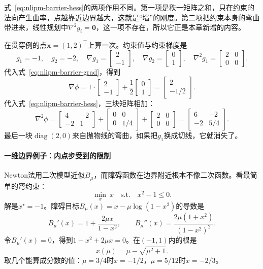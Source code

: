 式~\eqref{eq:nlipm-barrier-hess}的两项作用不同。第一项是秩一矩阵之和，只在约束的法向产生曲率，点越靠近边界越大，这就是“墙”的刚度。第二项把约束本身的弯曲带进来，线性规划中$\nabla^2g_i=\bm{0}$，这一项不存在，所以它正是本章新增的内容。

在贯穿例的点$\bm{x}=(1,2)^\top$上算一次。约束值与约束梯度是
\[
 g_1=-1,\quad g_2=-2,\quad\nabla g_1=\begin{bmatrix}2\\-1\end{bmatrix},\quad\nabla g_2=\begin{bmatrix}0\\1\end{bmatrix},\quad\nabla^2g_1=\begin{bmatrix}2&0\\0&0\end{bmatrix}.
\]
代入式~\eqref{eq:nlipm-barrier-grad}，得到
\[
 \nabla\phi=1\cdot\begin{bmatrix}2\\-1\end{bmatrix}+\frac12\begin{bmatrix}0\\1\end{bmatrix}=\begin{bmatrix}2\\-1/2\end{bmatrix}.
\]
代入式~\eqref{eq:nlipm-barrier-hess}，三块矩阵相加：
\[
 \nabla^2\phi=\begin{bmatrix}4&-2\\-2&1\end{bmatrix}+\begin{bmatrix}0&0\\0&1/4\end{bmatrix}+\begin{bmatrix}2&0\\0&0\end{bmatrix}=\begin{bmatrix}6&-2\\-2&5/4\end{bmatrix}.
\]
最后一块$\operatorname{diag}(2,0)$来自抛物线的弯曲，如果把$g_1$换成切线，它就消失了。

\paragraph{一维边界例子：内点步受到的限制}
Newton法用二次模型近似$B_\mu$，而障碍函数在边界附近根本不像二次函数。看最简单的弯约束：
\[
 \min_x\ x\quad\text{s.t.}\quad x^2-1\leq0.
\]
解是$x^\star=-1$。障碍目标$B_\mu(x)=x-\mu\log(1-x^2)$的导数是
\[
 B_\mu'(x)=1+\frac{2\mu x}{1-x^2},\qquad B_\mu''(x)=\frac{2\mu(1+x^2)}{(1-x^2)^2}.
\]
令$B_\mu'(x)=0$，得到$1-x^2+2\mu x=0$。在$(-1,1)$内的根是
\begin{equation}
 x(\mu)=\mu-\sqrt{\mu^2+1}.
 \label{eq:nlipm-1d-center}
\end{equation}
取几个能算成分数的值：$\mu=3/4$时$x=-1/2$，$\mu=5/12$时$x=-2/3$。

